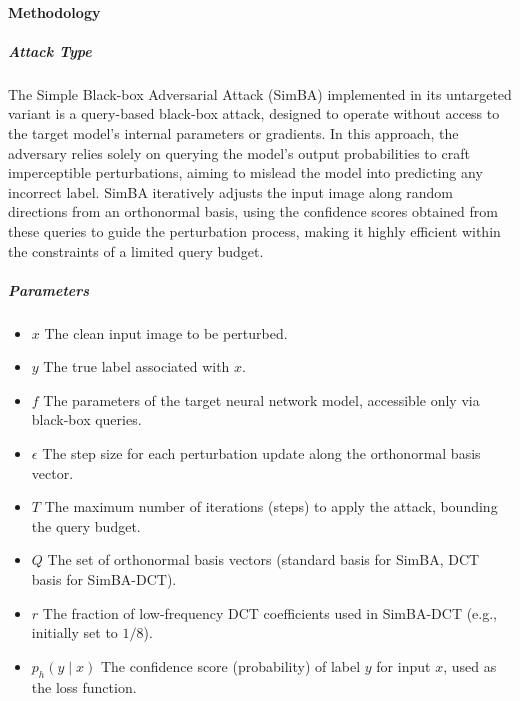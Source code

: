 \documentclass[../main.tex]{subfiles}
\begin{document}
\paragraph{Methodology}
\subparagraph{Attack Type}

The Simple Black-box Adversarial Attack (SimBA) implemented in its untargeted variant is a query-based black-box attack, designed to operate without access to the target model's internal parameters or gradients. In this approach, the adversary relies solely on querying the model's output probabilities to craft imperceptible perturbations, aiming to mislead the model into predicting any incorrect label. SimBA iteratively adjusts the input image along random directions from an orthonormal basis, using the confidence scores obtained from these queries to guide the perturbation process, making it highly efficient within the constraints of a limited query budget.
\subparagraph{Parameters}
\begin{itemize}
    \item $x$ The clean input image to be perturbed.
    \item $y$ The true label associated with $x$.
    \item $f$ The parameters of the target neural network model, accessible only via black-box queries.
    \item $\epsilon$ The step size for each perturbation update along the orthonormal basis vector.
    \item $T$ The maximum number of iterations (steps) to apply the attack, bounding the query budget.
    \item $Q$ The set of orthonormal basis vectors (standard basis for SimBA, DCT basis for SimBA-DCT).
    \item $r$ The fraction of low-frequency DCT coefficients used in SimBA-DCT (e.g., initially set to $1/8$).
    \item $p_h(y \mid x)$ The confidence score (probability) of label $y$ for input $x$, used as the loss function.
\end{itemize}
\end{document}
